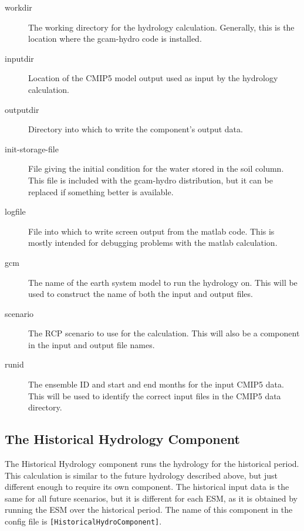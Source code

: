 \documentclass[11pt]{article}
\begin{document}
\begin{description}
\item[workdir] The working directory for the hydrology calculation.
  Generally, this is the location where the gcam-hydro code is
  installed.
\item[inputdir] Location of the CMIP5 model output used as input by the
  hydrology calculation.
\item[outputdir] Directory into which to write the component's output
  data.
\item[init-storage-file] File giving the initial condition for the
  water stored in the soil column.  This file is included with the
  gcam-hydro distribution, but it can be replaced if something better
  is available.
\item[logfile] File into which to write screen output from the matlab
  code.  This is mostly intended for debugging problems with the
  matlab calculation.
\item[gcm] The name of the earth system model to run the hydrology
  on.  This will be used to construct the name of both the input and
  output files.
\item[scenario] The RCP scenario to use for the calculation.  This
  will also be a component in the input and output file names.
\item[runid] The ensemble ID and start and end months for the input
  CMIP5 data.  This will be used to identify the correct input files
  in the CMIP5 data directory.
\end{description}

\subsection{The Historical Hydrology Component}
The Historical Hydrology component runs the hydrology for the historical
period.  This calculation is similar to the future hydrology described
above, but just different enough to require its own component.  The
historical input data is the same for all future scenarios, but it is
different for each ESM, as it is obtained by running the ESM over the
historical period.  The name of this component in the config file is
\texttt{[HistoricalHydroComponent]}.
\end{document}
